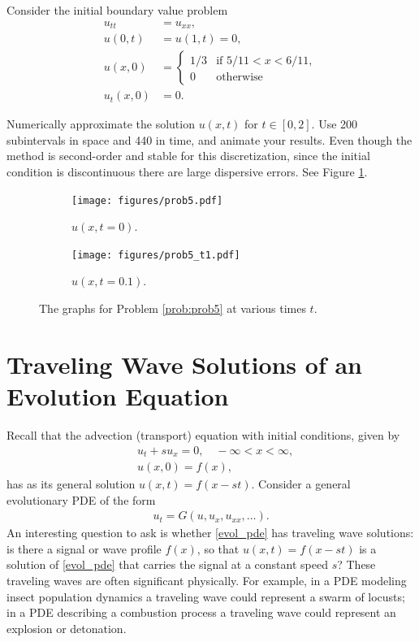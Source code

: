 \begin{problem}
\label{prob:prob5}
Consider the initial boundary value problem
\begin{align*}
	u_{tt} &= u_{xx}, \\
	u(0,t) &= u(1,t) = 0, \\
	u(x,0) &= \begin{cases} 1/3 & \text{if } 5/11 < x < 6/11,\\
	0 & \text{otherwise}
	\end{cases}\\
	u_t(x,0) &= 0.
\end{align*}

Numerically approximate the solution $u(x,t)$ for $t \in \left[0, 2\right]$.
Use 200 subintervals in space and 440 in time, and animate your results.
Even though the method is second-order and stable for this discretization, since the initial condition is discontinuous there are large dispersive errors.
See Figure \ref{fig:prob5}.

\begin{figure}[H]
\centering
\begin{subfigure}{.49\textwidth}
\centering
\texttt{[image: figures/prob5.pdf]}
\caption{$u(x,t=0)$.}
\end{subfigure}
%
\begin{subfigure}{.49\textwidth}
\centering
\texttt{[image: figures/prob5\_t1.pdf]}
\caption{$u(x,t = 0.1)$.}
\end{subfigure}
\caption{The graphs for Problem \ref{prob:prob5} at various times $t$.}
\label{fig:prob5}
\end{figure}
\end{problem}

\section*{Traveling Wave Solutions of an Evolution Equation}
Recall that the advection (transport) equation with initial conditions, given by
\begin{align*}
	&{ }u_t + su_x  = 0, \quad -\infty < x < \infty, \\
	&{ }u(x,0) = f(x),
\end{align*}
has as its general solution $u(x,t) = f(x -st)$.
Consider a general evolutionary PDE of the form
\begin{align}
u_t = G(u,u_x, u_{xx}, \ldots).
\label{evol_pde}
\end{align}
An interesting question to ask is whether \eqref{evol_pde} has traveling wave solutions: is there a signal or wave profile $f(x)$, so that $u(x,t) = f(x-st)$ is a solution of \eqref{evol_pde} that carries the signal at a constant speed $s$?
These traveling waves are often significant physically.
For example, in a PDE modeling insect population dynamics a traveling wave could represent a swarm of locusts; in a PDE describing a combustion process a traveling wave could represent an explosion or detonation.

